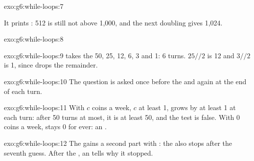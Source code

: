 \begin{solution}{exo:g6:while-loops:7}
\label{lst:g6:while-loops:sol-doubling}

It prints : 512 is still not above 1,000, and
the next doubling gives 1,024.
\end{solution}

\begin{solution}{exo:g6:while-loops:8}
\label{lst:g6:while-loops:sol-digit-sum}
\end{solution}

\begin{solution}{exo:g6:while-loops:9}
 takes the  50, 25, 12, 6, 3 and 1: 6 turns. $25 // 2$ is 12 and
$3 // 2$ is 1, since \code{//} drops the remainder.
\end{solution}

\begin{solution}{exo:g6:while-loops:10}
The question is asked once before the  and again at the end of each turn.

\label{lst:g6:while-loops:sol-ask}
\end{solution}

\begin{solution}{exo:g6:while-loops:11}
With $c$ coins a week, $c$ at least 1,  grows by at least 1 at each
turn: after 50 turns at most, it is at least 50, and the test 
is false. With 0 coins a week,  stays 0 for ever: an .
\end{solution}

\begin{solution}{exo:g6:while-loops:12}
The  gains a second part with : the  also stops after
the seventh guess. After the , an  tells why it stopped.

\label{lst:g6:while-loops:sol-guess}
\end{solution}

